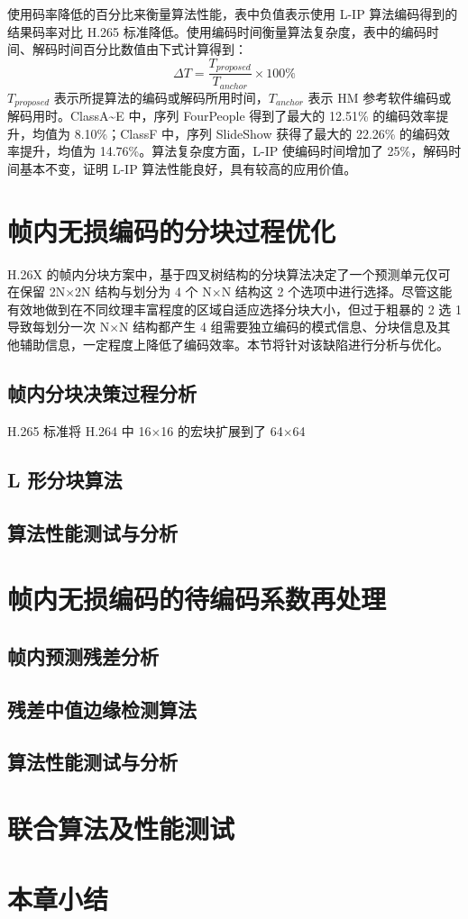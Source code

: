 使用码率降低的百分比来衡量算法性能，表中负值表示使用 L-IP 算法编码得到的结果码率对比 H.265 标准降低。使用编码时间衡量算法复杂度，表中的编码时间、解码时间百分比数值由下式计算得到：
\begin{equation}
    \Delta T=\frac{T_{proposed}}{T_{anchor}}\times 100\%
\end{equation}
$T_{proposed}$ 表示所提算法的编码或解码所用时间，$T_{anchor}$ 表示 HM 参考软件编码或解码用时。ClassA\textasciitilde E 中，序列 FourPeople 得到了最大的 12.51\% 的编码效率提升，均值为 8.10\%；ClassF 中，序列 SlideShow 获得了最大的 22.26\% 的编码效率提升，均值为 14.76\%。算法复杂度方面，L-IP 使编码时间增加了 25\%，解码时间基本不变，证明 L-IP 算法性能良好，具有较高的应用价值。

\section{帧内无损编码的分块过程优化}
H.26X 的帧内分块方案中，基于四叉树结构的分块算法决定了一个预测单元仅可在保留 2N$\times$2N 结构与划分为 4 个 N$\times$N 结构这 2 个选项中进行选择。尽管这能有效地做到在不同纹理丰富程度的区域自适应选择分块大小，但过于粗暴的 2 选 1 导致每划分一次 N$\times$N 结构都产生 4 组需要独立编码的模式信息、分块信息及其他辅助信息，一定程度上降低了编码效率。本节将针对该缺陷进行分析与优化。

\subsection{帧内分块决策过程分析}
H.265 标准将 H.264 中 16$\times$16 的宏块扩展到了 64$\times$64

\subsection{L 形分块算法}

\subsection{算法性能测试与分析}


\section{帧内无损编码的待编码系数再处理}

\subsection{帧内预测残差分析}


\subsection{残差中值边缘检测算法}

\subsection{算法性能测试与分析}


\section{联合算法及性能测试}

\section{本章小结}